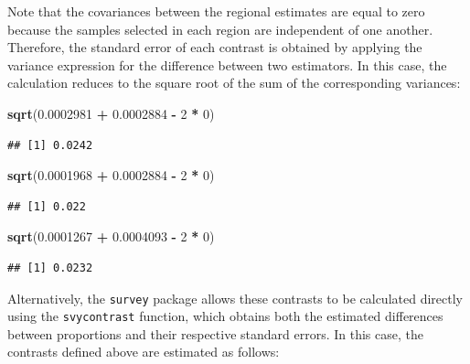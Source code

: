 \documentclass[
  english,
  12pt,
]{book}
\newenvironment{Shaded}{\begin{snugshade}}{\end{snugshade}}
\newcommand{\DecValTok}[1]{\textcolor[rgb]{0.00,0.00,0.81}{#1}}
\newcommand{\FloatTok}[1]{\textcolor[rgb]{0.00,0.00,0.81}{#1}}
\newcommand{\FunctionTok}[1]{\textcolor[rgb]{0.13,0.29,0.53}{\textbf{#1}}}
\newcommand{\NormalTok}[1]{#1}
\newcommand{\SpecialCharTok}[1]{\textcolor[rgb]{0.81,0.36,0.00}{\textbf{#1}}}
\begin{document}
Note that the covariances between the regional estimates are equal to zero because the samples selected in each region are independent of one another. Therefore, the standard error of each contrast is obtained by applying the variance expression for the difference between two estimators. In this case, the calculation reduces to the square root of the sum of the corresponding variances:

\begin{Shaded}
\begin{Highlighting}[]
\FunctionTok{sqrt}\NormalTok{(}\FloatTok{0.0002981} \SpecialCharTok{+} \FloatTok{0.0002884} \SpecialCharTok{{-}} \DecValTok{2} \SpecialCharTok{*} \DecValTok{0}\NormalTok{)}
\end{Highlighting}
\end{Shaded}

\begin{verbatim}
## [1] 0.0242
\end{verbatim}

\begin{Shaded}
\begin{Highlighting}[]
\FunctionTok{sqrt}\NormalTok{(}\FloatTok{0.0001968} \SpecialCharTok{+} \FloatTok{0.0002884} \SpecialCharTok{{-}} \DecValTok{2} \SpecialCharTok{*} \DecValTok{0}\NormalTok{)}
\end{Highlighting}
\end{Shaded}

\begin{verbatim}
## [1] 0.022
\end{verbatim}

\begin{Shaded}
\begin{Highlighting}[]
\FunctionTok{sqrt}\NormalTok{(}\FloatTok{0.0001267} \SpecialCharTok{+} \FloatTok{0.0004093} \SpecialCharTok{{-}} \DecValTok{2} \SpecialCharTok{*} \DecValTok{0}\NormalTok{)}
\end{Highlighting}
\end{Shaded}

\begin{verbatim}
## [1] 0.0232
\end{verbatim}

Alternatively, the \texttt{survey} package allows these contrasts to be calculated directly using the \texttt{svycontrast} function, which obtains both the estimated differences between proportions and their respective standard errors. In this case, the contrasts defined above are estimated as follows:
\end{document}
